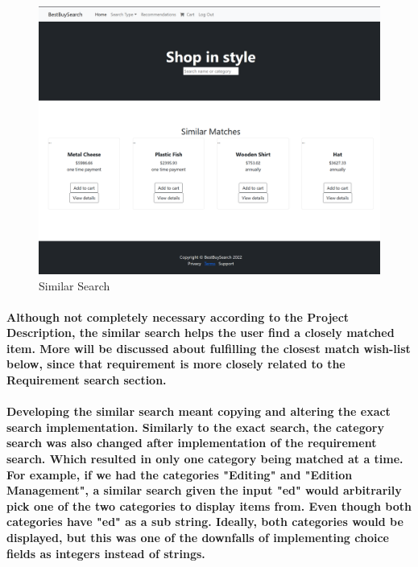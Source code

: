 \documentclass[sigconf]{acmart}
\begin{document}
\begin{figure}[H]
    \centering
    \includegraphics[scale=0.2]{ProductsSimilar.PNG}
    \caption{Similar Search}
    \label{fig:my_label}
\end{figure}

\paragraph{ Although not completely necessary according to the Project Description, the similar search helps the user find a closely matched item. More will be discussed about fulfilling the closest match wish-list below, since that requirement is more closely related to the Requirement search section. } 

\paragraph{ Developing the similar search meant copying and altering the exact search implementation. Similarly to the exact search, the category search was also changed after implementation of the requirement search. Which resulted in only one category being matched at a time. For example, if we had the categories "Editing" and "Edition Management", a similar search given the input "ed" would arbitrarily pick one of the two categories to display items from. Even though both categories have "ed" as a sub string. Ideally, both categories would be displayed, but this was one of the downfalls of implementing choice fields as integers instead of strings. }
\end{document}
